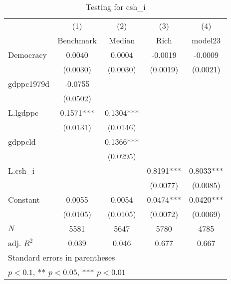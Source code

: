 \begin{table}[htbp]\centering
\def\sym#1{\ifmmode^{#1}\else\(^{#1}\)\fi}
\caption{Testing for csh\_i \label{tab:regression2}}
\begin{tabular}{l*{4}{c}}
\hline\hline
            &\multicolumn{1}{c}{(1)}&\multicolumn{1}{c}{(2)}&\multicolumn{1}{c}{(3)}&\multicolumn{1}{c}{(4)}\\
            &\multicolumn{1}{c}{Benchmark}&\multicolumn{1}{c}{Median}&\multicolumn{1}{c}{Rich}&\multicolumn{1}{c}{model23}\\
\hline
Democracy   &      0.0040   &      0.0004   &     -0.0019   &     -0.0009   \\
            &    (0.0030)   &    (0.0030)   &    (0.0019)   &    (0.0021)   \\
[1em]
gdppc1979d  &     -0.0755   &               &               &               \\
            &    (0.0502)   &               &               &               \\
[1em]
L.lgdppc    &      0.1571***&      0.1304***&               &               \\
            &    (0.0131)   &    (0.0146)   &               &               \\
[1em]
gdppcld     &               &      0.1366***&               &               \\
            &               &    (0.0295)   &               &               \\
[1em]
L.csh\_i     &               &               &      0.8191***&      0.8033***\\
            &               &               &    (0.0077)   &    (0.0085)   \\
[1em]
Constant    &      0.0055   &      0.0054   &      0.0474***&      0.0420***\\
            &    (0.0105)   &    (0.0105)   &    (0.0072)   &    (0.0069)   \\
\hline
\(N\)       &        5581   &        5647   &        5780   &        4785   \\
adj. \(R^{2}\)&       0.039   &       0.046   &       0.677   &       0.667   \\
\hline\hline
\multicolumn{5}{l}{\footnotesize Standard errors in parentheses}\\
\multicolumn{5}{l}{\footnotesize * \(p<0.1\), ** \(p<0.05\), *** \(p<0.01\)}\\
\end{tabular}
\end{table}
